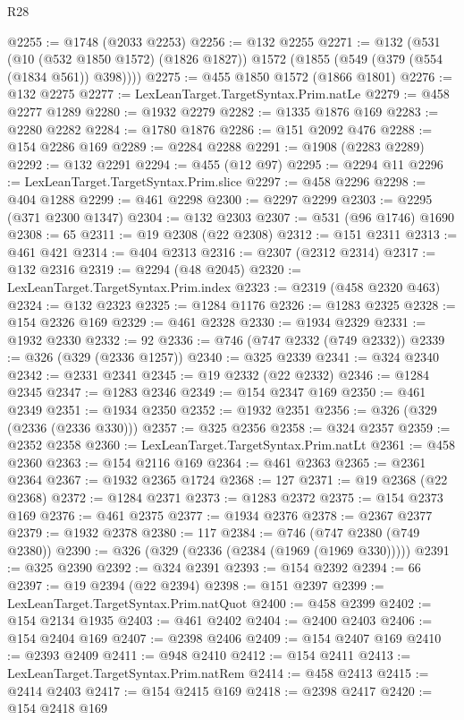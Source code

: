 \begin{lexlean}{R28}
\begin{coremodule}
@2255 := @1748 (@2033 @2253)
@2256 := @132 @2255
@2271 := @132
    (@531
      (@10 (@532 @1850 @1572) (@1826 @1827))
      @1572
      (@1855 (@549 (@379 (@554 (@1834 @561)) @398))))
@2275 := @455 @1850 @1572 (@1866 @1801)
@2276 := @132 @2275
@2277 := LexLeanTarget.TargetSyntax.Prim.natLe
@2279 := @458 @2277 @1289
@2280 := @1932 @2279
@2282 := @1335 @1876 @169
@2283 := @2280 @2282
@2284 := @1780 @1876
@2286 := @151 @2092 @476
@2288 := @154 @2286 @169
@2289 := @2284 @2288
@2291 := @1908 (@2283 @2289)
@2292 := @132 @2291
@2294 := @455 (@12 @97)
@2295 := @2294 @11
@2296 := LexLeanTarget.TargetSyntax.Prim.slice
@2297 := @458 @2296
@2298 := @404 @1288
@2299 := @461 @2298
@2300 := @2297 @2299
@2303 := @2295 (@371 @2300 @1347)
@2304 := @132 @2303
@2307 := @531 (@96 @1746) @1690
@2308 := 65
@2311 := @19 @2308 (@22 @2308)
@2312 := @151 @2311
@2313 := @461 @421
@2314 := @404 @2313
@2316 := @2307 (@2312 @2314)
@2317 := @132 @2316
@2319 := @2294 (@48 @2045)
@2320 := LexLeanTarget.TargetSyntax.Prim.index
@2323 := @2319 (@458 @2320 @463)
@2324 := @132 @2323
@2325 := @1284 @1176
@2326 := @1283 @2325
@2328 := @154 @2326 @169
@2329 := @461 @2328
@2330 := @1934 @2329
@2331 := @1932 @2330
@2332 := 92
@2336 := @746 (@747 @2332 (@749 @2332))
@2339 := @326 (@329 (@2336 @1257))
@2340 := @325 @2339
@2341 := @324 @2340
@2342 := @2331 @2341
@2345 := @19 @2332 (@22 @2332)
@2346 := @1284 @2345
@2347 := @1283 @2346
@2349 := @154 @2347 @169
@2350 := @461 @2349
@2351 := @1934 @2350
@2352 := @1932 @2351
@2356 := @326 (@329 (@2336 (@2336 @330)))
@2357 := @325 @2356
@2358 := @324 @2357
@2359 := @2352 @2358
@2360 := LexLeanTarget.TargetSyntax.Prim.natLt
@2361 := @458 @2360
@2363 := @154 @2116 @169
@2364 := @461 @2363
@2365 := @2361 @2364
@2367 := @1932 @2365 @1724
@2368 := 127
@2371 := @19 @2368 (@22 @2368)
@2372 := @1284 @2371
@2373 := @1283 @2372
@2375 := @154 @2373 @169
@2376 := @461 @2375
@2377 := @1934 @2376
@2378 := @2367 @2377
@2379 := @1932 @2378
@2380 := 117
@2384 := @746 (@747 @2380 (@749 @2380))
@2390 := @326 (@329 (@2336 (@2384 (@1969 (@1969 @330)))))
@2391 := @325 @2390
@2392 := @324 @2391
@2393 := @154 @2392
@2394 := 66
@2397 := @19 @2394 (@22 @2394)
@2398 := @151 @2397
@2399 := LexLeanTarget.TargetSyntax.Prim.natQuot
@2400 := @458 @2399
@2402 := @154 @2134 @1935
@2403 := @461 @2402
@2404 := @2400 @2403
@2406 := @154 @2404 @169
@2407 := @2398 @2406
@2409 := @154 @2407 @169
@2410 := @2393 @2409
@2411 := @948 @2410
@2412 := @154 @2411
@2413 := LexLeanTarget.TargetSyntax.Prim.natRem
@2414 := @458 @2413
@2415 := @2414 @2403
@2417 := @154 @2415 @169
@2418 := @2398 @2417
@2420 := @154 @2418 @169

\end{coremodule}
\end{lexlean}
